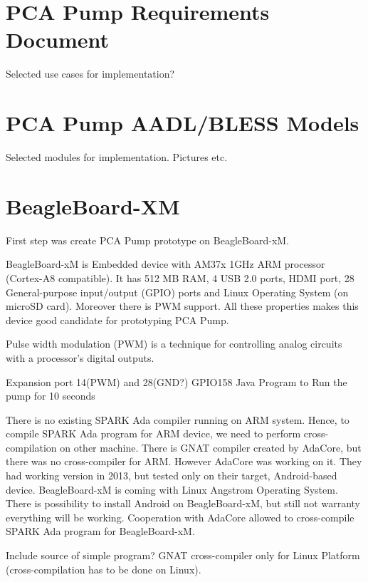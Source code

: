 \section{PCA Pump Requirements Document}
\label{pcapump:requirements-doc}

Selected use cases for implementation?





\section{PCA Pump AADL/BLESS Models}
\label{pcapump:aadl-bless-models}
Selected modules for implementation. Pictures etc.



\section{BeagleBoard-XM}
\label{pcapump:beagleboard}
First step was create PCA Pump prototype on BeagleBoard-xM.

BeagleBoard-xM is Embedded device with AM37x 1GHz ARM processor (Cortex-A8 compatible). It has 512 MB RAM, 4 USB 2.0 ports, HDMI port, 28 General-purpose input/output (GPIO) ports and Linux Operating System (on microSD card). Moreover there is PWM support. All these properties makes this device good candidate for prototyping PCA Pump.

Pulse width modulation (PWM) is a technique for controlling analog circuits with a processor's digital outputs.

Expansion port 14(PWM) and 28(GND?)
GPIO158
Java Program to Run the pump for 10 seconds

There is no existing SPARK Ada compiler running on ARM system. Hence, to compile SPARK Ada program for ARM device, we need to perform cross-compilation on other machine. There is GNAT compiler \cite{Horn:Thesis} created by AdaCore, but there was no cross-compiler for ARM. However AdaCore was working on it. They had working version in 2013, but tested only on their target, Android-based device. BeagleBoard-xM is coming with Linux Angstrom Operating System. There is possibility to install Android on BeagleBoard-xM, but still not warranty everything will be working. Cooperation with AdaCore allowed to cross-compile SPARK Ada program for BeagleBoard-xM.

Include source of simple program?
GNAT cross-compiler only for Linux Platform (cross-compilation has to be done on Linux).

